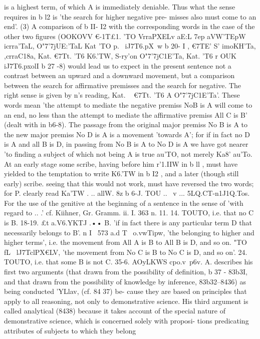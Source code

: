 {{{{{{{{{{{{{{{{{is a highest term, of which A is immediately deniable. Thus what
the sense requires in b l2 is 'the search for higher negative pre-
misses also must come to an end'. (3) A comparison of b II- I2
with the corresponding words in the case of the other two figures
(OOKOVV €-1T£1. 'TO VrraPXELv aE:L 7ep aVW'TEpW icrra'TaL, O"7'7jUE:'TaL Kat 'TO
p.~ iJ7T6.pX~w b 20- I , €7TE' S' imoKH'Ta, ,crraC18a, Kat. €7Tt. 'T6 K6.'TW,
S-ry'\OIl on O"7'7jC1E'Ta, Kat. 'T6 r OUK iJ7T6.pxolI b 27 -8) would lead us to
expect in the present sentence not a contrast between an upward
and a downward movement, but a comparison between the
search for affirmative premisses and the search for negative.
The right sense is given by n's reading, Kat. ~ €7Tt. 'T6 A O"7'7jC1E'Ta'.
These words mean 'the attempt to mediate the negative premiss
NoB is A will come to an end, no less than the attempt to mediate
the affirmative premiss All C is B' (dealt with in b6-8). The
passage from the original major premiss No B is A to the new
major premiss No D is A is a movement 'towards A'; for if in
fact no D is A and all B is D, in passing from No B is A to No
D is A we have got nearer 'to finding a subject of which not being
A is true au'TO, not merely Ka8' au'To.
At an early stage some scribe, having before him r'1.IIW in b ll ,
must have yielded to the temptation to write K6.'TW in b I2 , and
a later (though still early) scribe. seeing that this would not
work, must have reversed the two words; for P. clearly read
Ka'TW . .. allW.
8z b 6-J. TOU .. ~v ... 5LQ.CT-n1J1Q.Tos. For the use of the genitive
at the beginning of a sentence in the sense of 'with regard to .. .'
cf. Kiihner, Gr. Gramm. ii. I. 363 n. 11.
14. TOUTO, i.e. that no C is B.
18-19. £t a.V6.YKTJ .•• B. 'if in fact there is any particular term
D that necessarily belongs to B'.
n
I
~573
a.d T~ o.vwTipw, 'the belonging to higher and
higher terms', i.e. the movement from All A is B to All B is D,
and so on. "TO fL~ lJ7TclPX€LV, 'the movement from No C is B to No
C is D, and so on'.
24. TOUTO, i.e. that some B is not C.
35-6. AOyLKWS
cpo.v~p6v. A. describes his first two
arguments (that drawn from the possibility of definition, b 37 -
83b3I, and that drawn from the possibility of knowledge by
inference, 83b32--8436) as being conducted '\0YLlav, (cf. 84 37) be-
cause they are based on principles that apply to all reasoning,
not only to demonstrative science. His third argument is called
analytical (8438) because it takes account of the special nature of
demonstrative science, which is concerned solely with proposi-
tions predicating attributes of subjects to which they belong
}}}}}}}}}}}}}}}}}
